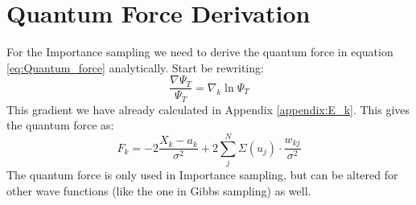 \documentclass[12pt,a4paper,english]{article}
\begin{document}
\section{Quantum Force Derivation}
\label{appendix:Quantum_force}
For the Importance sampling we need to derive the quantum force in equation \ref{eq:Quantum_force} analytically. Start be rewriting:
\begin{equation*}
\frac{\nabla\Psi_T}{\Psi_T}=\nabla_k\ln\Psi_T
\end{equation*}
This gradient we have already calculated in Appendix \ref{appendix:E_k}. This gives the quantum force as:
\begin{equation}
\label{eq:Quantum_force_derived}
F_k=-2\frac{X_k-a_k}{\sigma^2} + 2\sum_{j}^{N}\Sigma(u_j)\cdot\frac{w_{kj}}{\sigma^2}
\end{equation}
The quantum force is only used in Importance sampling, but can be altered for other wave functions (like the one in Gibbs sampling) as well.



\end{document}
